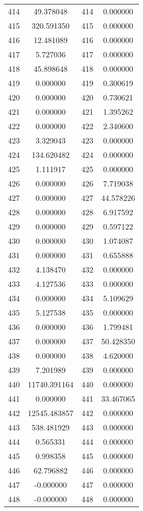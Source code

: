 \documentclass[12pt]{article}
\begin{document}
\begin{longtable}{@{}cccc@{}}
414 & 49.378048 & 414 & 0.000000 \\
415 & 320.591350 & 415 & 0.000000 \\
416 & 12.481089 & 416 & 0.000000 \\
417 & 5.727036 & 417 & 0.000000 \\
418 & 45.898648 & 418 & 0.000000 \\
419 & 0.000000 & 419 & 0.300619 \\
420 & 0.000000 & 420 & 0.730621 \\
421 & 0.000000 & 421 & 1.395262 \\
422 & 0.000000 & 422 & 2.340600 \\
423 & 3.329043 & 423 & 0.000000 \\
424 & 134.620482 & 424 & 0.000000 \\
425 & 1.111917 & 425 & 0.000000 \\
426 & 0.000000 & 426 & 7.719038 \\
427 & 0.000000 & 427 & 44.578226 \\
428 & 0.000000 & 428 & 6.917592 \\
429 & 0.000000 & 429 & 0.597122 \\
430 & 0.000000 & 430 & 1.074087 \\
431 & 0.000000 & 431 & 0.655888 \\
432 & 4.138470 & 432 & 0.000000 \\
433 & 4.127536 & 433 & 0.000000 \\
434 & 0.000000 & 434 & 5.109629 \\
435 & 5.127538 & 435 & 0.000000 \\
436 & 0.000000 & 436 & 1.799481 \\
437 & 0.000000 & 437 & 50.428350 \\
438 & 0.000000 & 438 & 4.620000 \\
439 & 7.201989 & 439 & 0.000000 \\
440 & 11740.391164 & 440 & 0.000000 \\
441 & 0.000000 & 441 & 33.467065 \\
442 & 12545.483857 & 442 & 0.000000 \\
443 & 538.481929 & 443 & 0.000000 \\
444 & 0.565331 & 444 & 0.000000 \\
445 & 0.998358 & 445 & 0.000000 \\
446 & 62.796882 & 446 & 0.000000 \\
447 & -0.000000 & 447 & 0.000000 \\
448 & -0.000000 & 448 & 0.000000 \\

\end{longtable}
\end{document}
